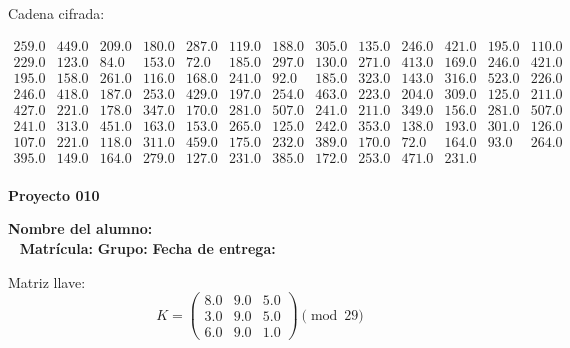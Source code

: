 \documentclass[12pt]{article}
\begin{document}
Cadena cifrada:
\begin{center}
$\begin{array}{lllllllllllll}
259.0 & 449.0 & 209.0 & 180.0 & 287.0 & 119.0 & 188.0 & 305.0 & 135.0 & 246.0 & 421.0 & 195.0 & 110.0\\
229.0 & 123.0 & 84.0 & 153.0 & 72.0 & 185.0 & 297.0 & 130.0 & 271.0 & 413.0 & 169.0 & 246.0 & 421.0\\
195.0 & 158.0 & 261.0 & 116.0 & 168.0 & 241.0 & 92.0 & 185.0 & 323.0 & 143.0 & 316.0 & 523.0 & 226.0\\
246.0 & 418.0 & 187.0 & 253.0 & 429.0 & 197.0 & 254.0 & 463.0 & 223.0 & 204.0 & 309.0 & 125.0 & 211.0\\
427.0 & 221.0 & 178.0 & 347.0 & 170.0 & 281.0 & 507.0 & 241.0 & 211.0 & 349.0 & 156.0 & 281.0 & 507.0\\
241.0 & 313.0 & 451.0 & 163.0 & 153.0 & 265.0 & 125.0 & 242.0 & 353.0 & 138.0 & 193.0 & 301.0 & 126.0\\
107.0 & 221.0 & 118.0 & 311.0 & 459.0 & 175.0 & 232.0 & 389.0 & 170.0 & 72.0 & 164.0 & 93.0 & 264.0\\
395.0 & 149.0 & 164.0 & 279.0 & 127.0 & 231.0 & 385.0 & 172.0 & 253.0 & 471.0 & 231.0\\
\end{array}$
\end{center}

\newpage


\textbf{Proyecto 010}

\textbf{Nombre del alumno:} \underline{\hspace{13cm}}\\\
\vspace{1cm}
\textbf{Matrícula:} \underline{\hspace{4cm}} \hspace{1cm}
\textbf{Grupo:} \underline{\hspace{2cm}}
\textbf{Fecha de entrega:} \underline{\hspace{2cm}}

\medskip

Matriz llave:
\[
K = \begin{pmatrix}
8.0 & 9.0 & 5.0\\
3.0 & 9.0 & 5.0\\
6.0 & 9.0 & 1.0
\end{pmatrix} \pmod{29}
\]
\end{document}
